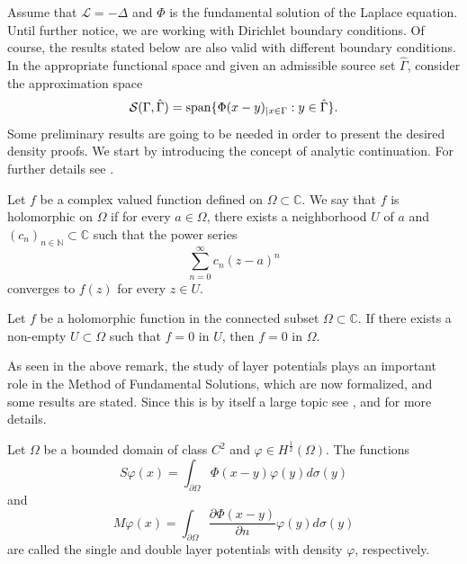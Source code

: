Assume that \(\mathcal{L} = -\Delta\) and \(\Phi\) is the fundamental solution of the Laplace equation. Until further notice, we are working with Dirichlet boundary conditions. Of course, the results stated below are also valid with different boundary conditions. In the appropriate functional space and given an admissible source set \(\hat{\Gamma}\), consider the approximation space
\[
    \mathcal{S}(\Gamma, \hat{\Gamma}) = \operatorname{span}\{\Phi(x-y)_{|x \in \Gamma} : y \in \hat{\Gamma}\}.
\]
Some preliminary results are going to be needed in order to present the desired density proofs.
We start by introducing the concept of analytic continuation. For further details see \cite{narasimhan2012complex}.
\begin{definition}
    Let \(f\) be a complex valued function defined on \(\Omega \subset \mathbb{C}\). We say that \(f\) is holomorphic on \(\Omega\) if for every \(a \in \Omega\), there exists a neighborhood \(U\) of \(a\) and \((c_n)_{n \in \mathbb{N}} \subset \mathbb{C}\) such that the power series
    \[
        \sum_{n=0}^{\infty} c_n(z-a)^n
    \]
    converges to \(f(z)\) for every \(z \in U\).
\end{definition}
\begin{theorem}\label{ana_cont}
    Let \(f\) be a holomorphic function in the connected subset \(\Omega \subset \mathbb{C}\). If there exists a non-empty \(U \subset \Omega\) such that \(f = 0\) in \(U\), then \(f = 0\) in \(\Omega\).
\end{theorem}
As seen in the above remark, the study of layer potentials plays an important role in the Method of Fundamental Solutions, which are now formalized, and some results are stated. Since this is by itself a large topic see \cite{chen2010boundary}, \cite{kress2013linear} and \cite{colton2013integral} for more details.
\begin{definition}\label{definition_single_and_double_layer_potentials}
    Let \(\Omega\) be a bounded domain of class \(C^2\) and \(\varphi \in H^\frac{1}{2}(\Omega)\). The functions
    \[
        S\varphi(x) = \int_{\partial\Omega} \Phi(x-y)\varphi(y) d\sigma(y)
    \]
    and
    \[
        M\varphi(x) = \int_{\partial\Omega} \frac{\partial \Phi(x-y)}{\partial n}\varphi(y) d\sigma(y)
    \]
    are called the single and double layer potentials with density \(\varphi\), respectively.
\end{definition}
